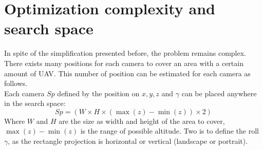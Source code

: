 %    


 
 \section{Optimization complexity and search space} \label{sec:OptimizationComplexity}
 
In spite of the simplification presented before, the problem remains complex. There exists many positions for each camera to cover an area with a certain amount of UAV. This number of position can be estimated for each camera as follows.\\   
Each camera $Sp$ defined by the position on $x, y, z $ and $ \gamma$ can be placed anywhere in the search space: 
\begin{equation}\label{eq:SearchSpace}
 Sp=(W\times H \times ( \max(z)-\min(z)) \times 2 )  
\end{equation}
Where $W$ and $H$ are the size as width and height of the area to cover, $\max(z)-\min(z)$ is the range of possible altitude. Two is to define the roll $\gamma$, as the rectangle projection is horizontal or vertical (landscape or portrait).%

